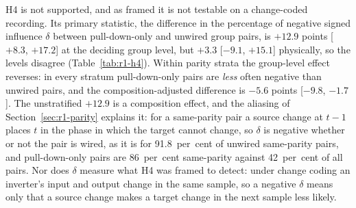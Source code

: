 H4 is not supported, and as framed it is not testable on a change-coded recording. Its primary statistic, the difference in the percentage of negative signed influence $\delta$ between pull-down-only and unwired group pairs, is $+12.9$ points [$+8.3$, $+17.2$] at the deciding group level, but $+3.3$ [$-9.1$, $+15.1$] physically, so the levels disagree (Table~\ref{tab:r1-h4}). Within parity strata the group-level effect reverses: in every stratum pull-down-only pairs are \emph{less} often negative than unwired pairs, and the composition-adjusted difference is $-5.6$ points [$-9.8$, $-1.7$]. The unstratified $+12.9$ is a composition effect, and the aliasing of Section~\ref{sec:r1-parity} explains it: for a same-parity pair a source change at $t-1$ places $t$ in the phase in which the target cannot change, so $\delta$ is negative whether or not the pair is wired, as it is for 91.8~per~cent of unwired same-parity pairs, and pull-down-only pairs are 86~per~cent same-parity against 42~per~cent of all pairs. Nor does $\delta$ measure what H4 was framed to detect: under change coding an inverter's input and output change in the same sample, so a negative $\delta$ means only that a source change makes a target change in the next sample less likely.




